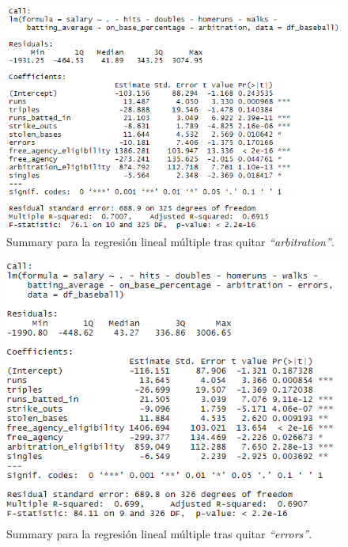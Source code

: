 \documentclass[a4paper,12pt, oneside]{book}
\begin{document}
\begin{figure}[H]
\centering
\includegraphics[scale=0.7]{images/multifit8.PNG}
\caption{Summary para la regresión lineal múltiple tras quitar \textit{``arbitration''}.}
\end{figure}

\begin{figure}[H]
\centering
\includegraphics[scale=0.7]{images/multifit9.PNG}
\caption{Summary para la regresión lineal múltiple tras quitar \textit{``errors''}.}
\end{figure}
\end{document}
